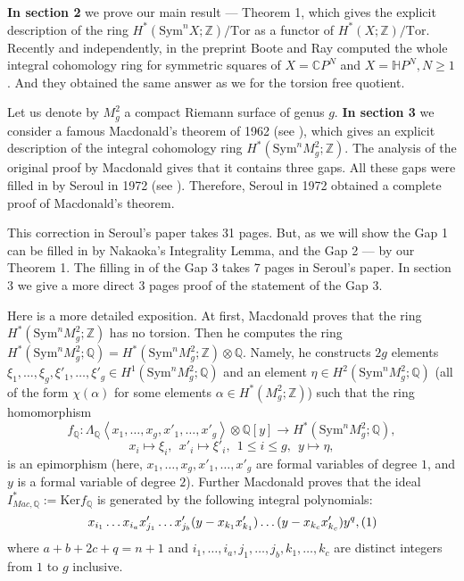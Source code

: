 \documentclass[a4paper,14pt]{article}
\newcommand{\Sym}{\mathrm{Sym}}
\newcommand{\Tor}{\mathrm{Tor}}
\newcommand{\Q}{\mathbb{Q}}
\newcommand{\Z}{\mathbb{Z}}
\begin{document}
{\bf In section 2} we prove our main result --- Theorem 1, which gives the explicit description of the ring $H^*(\Sym^n X;\Z)/\Tor$ as a functor of $H^*(X;\Z)/\Tor$. Recently and independently, in the preprint \cite{Ray} Boote and Ray computed the whole integral cohomology ring for symmetric squares of $X=\mathbb{C} P^N$ and $X=\mathbb{H}P^N, N\ge 1$. And they obtained the same answer as we for the torsion free quotient. 





Let us denote by $M^2_g$ a compact Riemann surface of genus $g$. {\bf In section 3} we consider a famous Macdonald's theorem of 1962 (see \cite{Mac1}), which gives an explicit description of the integral cohomology ring $H^*(\Sym^n M^2_g;\Z)$. The analysis of the original proof by Macdonald gives that it contains three gaps. All these gaps were filled in by Seroul in 1972 (see \cite{Ser}). Therefore, Seroul in 1972 obtained a complete proof of Macdonald's theorem. 

This correction in Seroul's paper takes 31 pages. But, as we will show the Gap 1 can be filled in by Nakaoka's Integrality Lemma, and the Gap 2 --- by our Theorem 1. The filling in of the Gap 3 takes 7 pages in Seroul's paper. In section 3 we give a more direct 3 pages proof of the statement of the Gap 3. 

Here is a more detailed exposition. At first, Macdonald proves that the ring $H^*(\Sym^n M^2_g;\Z)$ has no torsion. Then he computes the ring $H^*(\Sym^n M^2_g;\Q) = H^*(\Sym^n M^2_g;\Z)\otimes \Q$. Namely, he constructs $2g$ elements $\xi_1,\ldots, \xi_g,\xi'_1,\ldots,\xi'_g\in H^1(\Sym^n M^2_g;\Q)$ and an element $\eta\in H^2(\Sym^n M^2_g;\Q)$ (all of the form $\chi(\alpha)$ for some elements $\alpha\in H^*(M^2_g;\Z)$) such that the ring homomorphism 
$$
f_{\Q}: \Lambda_{\Q} \left< x_1,\ldots,x_g,x'_1,\ldots,x'_g \right>\otimes \Q[y] \to H^*(\Sym^n M^2_g;\Q),
$$
$$
x_i \mapsto \xi_i, \ \  x'_i \mapsto \xi'_i, \ \ 1\le i\le g, \ \ y \mapsto \eta,
$$
is an epimorphism (here, $x_1,\ldots,x_g,x'_1,\ldots,x'_g$ are formal variables of degree $1$, and $y$ is a formal variable of degree $2$). Further Macdonald proves that the ideal $I^*_{Mac, \Q}:= \mathrm{Ker} f_{\Q}$ is generated by the following integral polynomials:
$$
x_{i_1}\ldots x_{i_a}x'_{j_1}\ldots x'_{j_b} (y - x_{k_1}x'_{k_1})\ldots  (y - x_{k_c}x'_{k_c}) y^q, \relax{(1)}
$$
where $a+b+2c+ q=n+1$ and $i_1,\ldots,i_a,j_1,\ldots,j_b,k_1,\ldots,k_c$ are distinct integers from $1$ to $g$ inclusive.
\end{document}
